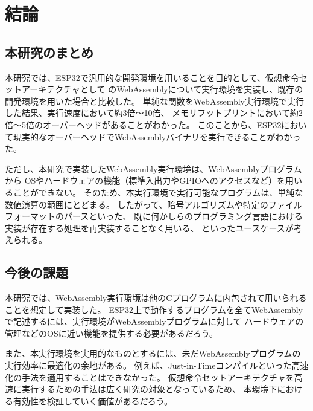 \chapter{結論}
\label{chap:conclusion}

\section{本研究のまとめ}
\label{section:matome}

本研究では、ESP32で汎用的な開発環境を用いることを目的として、仮想命令セットアーキテクチャとして
のWebAssemblyについて実行環境を実装し、既存の開発環境を用いた場合と比較した。
単純な関数をWebAssembly実行環境で実行した結果、実行速度において約3倍〜10倍、
メモリフットプリントにおいて約2倍〜5倍のオーバーヘッドがあることがわかった。
このことから、ESP32において現実的なオーバーヘッドでWebAssemblyバイナリを実行できることがわかった。

ただし、本研究で実装したWebAssembly実行環境は、WebAssemblyプログラムから
OSやハードウェアの機能（標準入出力やGPIOへのアクセスなど）を用いることができない。
そのため、本実行環境で実行可能なプログラムは、単純な数値演算の範囲にとどまる。
したがって、暗号アルゴリズムや特定のファイルフォーマットのパースといった、
既に何かしらのプログラミング言語における実装が存在する処理を再実装することなく用いる、
といったユースケースが考えられる。

\section{今後の課題}

本研究では、WebAssembly実行環境は他のCプログラムに内包されて用いられることを想定して実装した。
ESP32上で動作するプログラムを全てWebAssemblyで記述するには、実行環境がWebAssemblyプログラムに対して
ハードウェアの管理などのOSに近い機能を提供する必要があるだろう。

また、本実行環境を実用的なものとするには、未だWebAssemblyプログラムの実行効率に最適化の余地がある。
例えば、Just-in-Timeコンパイルといった高速化の手法を適用することはできなかった。
仮想命令セットアーキテクチャを高速に実行するための手法は広く研究の対象となっているため、
本環境下における有効性を検証していく価値があるだろう。

